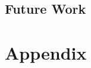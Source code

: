 \documentclass[11pt]{article}
\begin{document}
\subsection{Future Work}













































































































\newpage
\section{Appendix}
\end{document}
